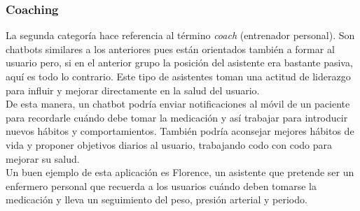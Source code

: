 \subsubsection{Coaching}
La segunda categoría hace referencia al término \textit{coach} (entrenador personal). Son chatbots similares a los anteriores pues están orientados también a formar al usuario pero, si en el anterior grupo la posición del asistente era bastante pasiva, aquí es todo lo contrario. Este tipo de asistentes toman una actitud de liderazgo para influir y mejorar directamente en la salud del usuario.\\

De esta manera, un chatbot podría enviar notificaciones al móvil de un paciente para recordarle cuándo debe tomar la medicación y así trabajar para introducir nuevos hábitos y comportamientos. También podría aconsejar mejores hábitos de vida y proponer objetivos diarios al usuario, trabajando codo con codo para mejorar su salud.\\

Un buen ejemplo de esta aplicación es Florence, un asistente que pretende ser un enfermero personal que recuerda a los usuarios cuándo deben tomarse la medicación y lleva un seguimiento del peso, presión arterial y periodo.\\

